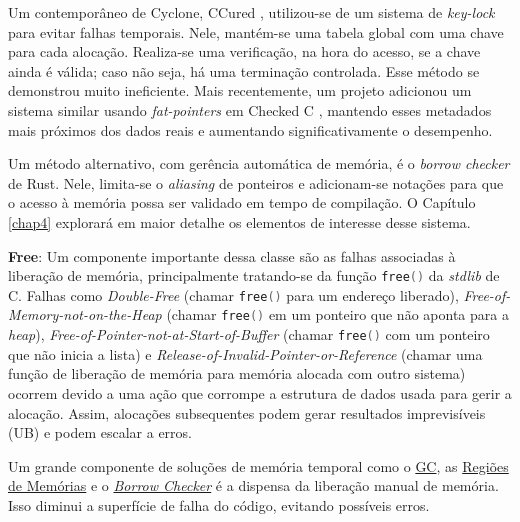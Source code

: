 \label{sec:mem-error:KeyLock}
Um contemporâneo de Cyclone, CCured \cite{CCURED}, utilizou-se de um sistema de \emph{key-lock} para evitar falhas temporais. Nele, mantém-se uma tabela global com uma chave para cada alocação. Realiza-se uma verificação, na hora do acesso, se a chave ainda é válida; caso não seja, há uma terminação controlada. Esse método se demonstrou muito ineficiente. Mais recentemente, um projeto adicionou um sistema similar usando \emph{fat-pointers} em Checked C \cite{FATPOINTERS}, mantendo esses metadados mais próximos dos dados reais e aumentando significativamente o desempenho.

\label{sec:mem-error:BorrowChecker}
Um método alternativo, com gerência automática de memória, é o \emph{borrow checker} de Rust. Nele, limita-se o \emph{aliasing} de ponteiros e adicionam-se notações para que o acesso à memória possa ser validado em tempo de compilação. O Capítulo \ref{chap4} explorará em maior detalhe os elementos de interesse desse sistema. 

\newcommand{\FREE}{\lstinline[language=C]|free()| }
\label{sec:mem-error:temporal:free}

\textbf{Free}: Um componente importante dessa classe são as falhas associadas à liberação de memória, principalmente tratando-se da função \FREE da \emph{stdlib} de C. Falhas como \emph{Double-Free} (chamar \FREE para um endereço liberado), \emph{Free-of-Memory-not-on-the-Heap} (chamar \FREE em um ponteiro que não aponta para a \emph{heap}), \emph{Free-of-Pointer-not-at-Start-of-Buffer} (chamar \FREE com um ponteiro que não inicia a lista) e \emph{Release-of-Invalid-Pointer-or-Reference} (chamar uma função de liberação de memória para memória alocada com outro sistema) ocorrem devido a uma ação que corrompe a estrutura de dados usada para gerir a alocação. Assim, alocações subsequentes podem gerar resultados imprevisíveis (UB) e podem escalar a erros.

Um grande componente de soluções de memória temporal como o \hyperref[sec:mem-error:GC]{GC}, as \hyperref[sec:mem-error:MemReg]{Regiões de Memórias} e o \hyperref[sec:mem-error:BorrowChecker]{\emph{Borrow Checker}} é a dispensa da liberação manual de memória. Isso diminui a superfície de falha do código, evitando possíveis erros.

\label{sec:mem-error:temporal:null}

